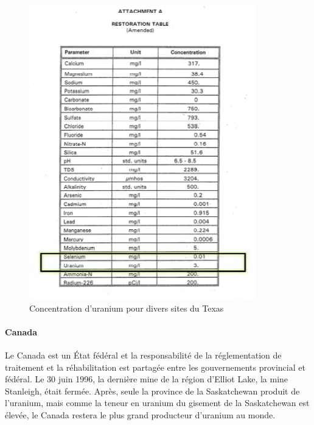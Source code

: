 \documentclass{article}
\begin{document}
\begin{figure}[H]
    \centering
    \includegraphics[width=\linewidth]{II_C_3.png}
    \caption{Concentration d'uranium pour divers sites du Texas}
    \label{fig:conc_u_texas}
\end{figure}

\newpage

\paragraph{Canada}

Le Canada est un État fédéral et la responsabilité de la réglementation de traitement et la réhabilitation est partagée entre les gouvernements provincial et fédéral. Le 30 juin 1996, la dernière mine de la région d'Elliot Lake, la mine Stanleigh, était fermée. Après, seule la province de la Saskatchewan produit de l'uranium, mais comme la teneur en uranium du gisement de la Saskatchewan est élevée, le Canada restera le plus grand producteur d'uranium au monde.
\end{document}
